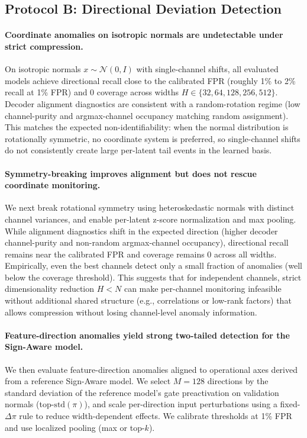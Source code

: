 \documentclass{article}
\begin{document}
\subsection{Protocol B: Directional Deviation Detection}
\label{sec:results_protocol_b}

\paragraph{Coordinate anomalies on isotropic normals are undetectable under strict compression.}
On isotropic normals $x \sim \mathcal{N}(0, I)$ with single-channel shifts, all evaluated models achieve directional recall close to the calibrated FPR (roughly 1\% to 2\% recall at 1\% FPR) and 0 coverage across widths $H \in \{32,64,128,256,512\}$. Decoder alignment diagnostics are consistent with a random-rotation regime (low channel-purity and argmax-channel occupancy matching random assignment). This matches the expected non-identifiability: when the normal distribution is rotationally symmetric, no coordinate system is preferred, so single-channel shifts do not consistently create large per-latent tail events in the learned basis.

\paragraph{Symmetry-breaking improves alignment but does not rescue coordinate monitoring.}
We next break rotational symmetry using heteroskedastic normals with distinct channel variances, and enable per-latent z-score normalization and max pooling. While alignment diagnostics shift in the expected direction (higher decoder channel-purity and non-random argmax-channel occupancy), directional recall remains near the calibrated FPR and coverage remains 0 across all widths. Empirically, even the best channels detect only a small fraction of anomalies (well below the coverage threshold). This suggests that for independent channels, strict dimensionality reduction $H < N$ can make per-channel monitoring infeasible without additional shared structure (e.g., correlations or low-rank factors) that allows compression without losing channel-level anomaly information.

\paragraph{Feature-direction anomalies yield strong two-tailed detection for the Sign-Aware model.}
We then evaluate feature-direction anomalies aligned to operational axes derived from a reference Sign-Aware model. We select $M=128$ directions by the standard deviation of the reference model's gate preactivation on validation normals (top-$\mathrm{std}(\pi)$), and scale per-direction input perturbations using a fixed-$\Delta \pi$ rule to reduce width-dependent effects. We calibrate thresholds at 1\% FPR and use localized pooling (max or top-$k$).
\end{document}
